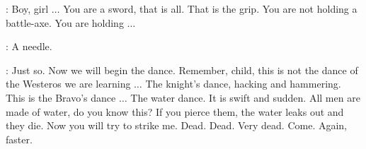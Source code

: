 \SYRIO: Boy, girl $\ldots$ You are a sword, that is all. That is the grip. You are not holding a battle-axe. You are holding $\ldots$ 

\ARYA: A needle. 

\SYRIO: Just so. Now we will begin the dance. Remember, child, this is not the dance of the Westeros we are learning $\ldots$ The knight's dance, hacking and hammering. This is the Bravo's dance $\ldots$ The water dance. It is swift and sudden. All men are made of water, do you know this? If you pierce them, the water leaks out and they die. Now you will try to strike me.  Dead. Dead. Very dead. Come. Again, faster. 



